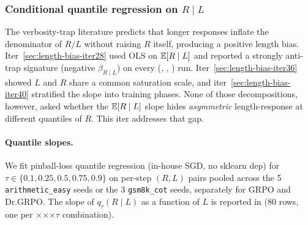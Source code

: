 
\subsubsection{Conditional quantile regression on $R \mid L$}\label{sec:lb-iter44}

The verbosity-trap literature predicts that longer responses inflate the
denominator of $R/L$ without raising $R$ itself, producing a positive length
bias. Iter~\ref{sec:length-bias-iter28} used OLS on $\mathbb{E}[R\mid L]$ and reported a
strongly anti-trap signature (negative $\beta_{R\mid L}$) on every
(\task, \algo, \seed) run. Iter~\ref{sec:length-bias-iter36} showed $L$ and $R$ share
a common saturation scale, and iter~\ref{sec:length-bias-iter40} stratified the slope
into training phases. None of those decompositions, however, asked whether the
$\mathbb{E}[R\mid L]$ slope hides \emph{asymmetric} length-response at different
quantiles of $R$. This iter addresses that gap.

\paragraph{Quantile slopes.}
We fit pinball-loss quantile regression (in-house SGD, no sklearn dep) for
$\tau \in \{0.1, 0.25, 0.5, 0.75, 0.9\}$ on per-step $(R, L)$ pairs pooled
across the 5 \texttt{arithmetic\_easy} seeds or the 3 \texttt{gsm8k\_cot}
seeds, separately for GRPO and Dr.GRPO. The slope of $q_\tau(R \mid L)$ as a
function of $L$ is reported in
 (80 rows,
one per \task$\times$\algo$\times$\seed$\times\tau$ combination).

